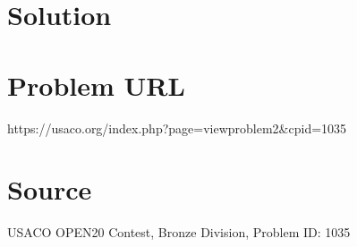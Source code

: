 \documentclass[12pt]{article}
\begin{document}
\section*{Solution}


\section*{Problem URL}
https://usaco.org/index.php?page=viewproblem2&cpid=1035

\section*{Source}
USACO OPEN20 Contest, Bronze Division, Problem ID: 1035
\end{document}
